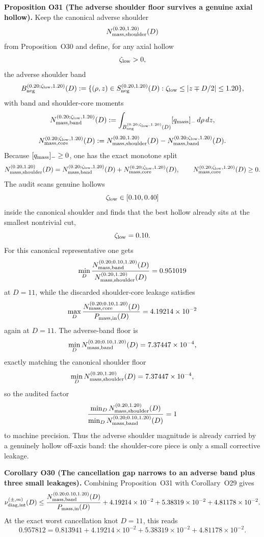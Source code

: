 \documentclass[aps,prd,onecolumn,notitlepage,nofootinbib,superscriptaddress,11pt,floatfix]{revtex4-2}
\begin{document}
\medskip\noindent\textbf{Proposition O31 (The adverse shoulder floor survives a genuine axial hollow).}
Keep the canonical adverse shoulder
\[
N_{\rm mass,shoulder}^{(0.20,1.20)}(D)
\]
from Proposition~O30 and define, for any axial hollow
\[
\zeta_{\rm low}>0,
\]
the adverse shoulder band
\[
B_{\rm neg}^{(0.20;\zeta_{\rm low},1.20)}(D)
:=
\{(\rho,z)\in S_{\rm neg}^{(0.20,1.20)}(D): \zeta_{\rm low}\le |z\mp D/2|\le 1.20\},
\]
with band and shoulder-core moments
\[
N_{\rm mass,band}^{(0.20;\zeta_{\rm low},1.20)}(D)
:=
\int_{B_{\rm neg}^{(0.20;\zeta_{\rm low},1.20)}(D)} [q_{\rm mass}]_-\,d\rho\,dz,
\]
\[
N_{\rm mass,core}^{(0.20;\zeta_{\rm low},1.20)}(D)
:=
N_{\rm mass,shoulder}^{(0.20,1.20)}(D)
-
N_{\rm mass,band}^{(0.20;\zeta_{\rm low},1.20)}(D).
\]
Because \([q_{\rm mass}]_-\ge 0\), one has the exact monotone split
\[
N_{\rm mass,shoulder}^{(0.20,1.20)}(D)
=
N_{\rm mass,band}^{(0.20;\zeta_{\rm low},1.20)}(D)
+
N_{\rm mass,core}^{(0.20;\zeta_{\rm low},1.20)}(D),
\qquad
N_{\rm mass,core}^{(0.20;\zeta_{\rm low},1.20)}(D)\ge 0.
\]
The audit
scans genuine hollows
\[
\zeta_{\rm low}\in[0.10,0.40]
\]
inside the canonical shoulder and finds that the best hollow already sits at the smallest nontrivial cut,
\[
\zeta_{\rm low}=0.10.
\]
For this canonical representative one gets
\[
\min_D
\frac{N_{\rm mass,band}^{(0.20;0.10,1.20)}(D)}
{N_{\rm mass,shoulder}^{(0.20,1.20)}(D)}
=
0.951019
\]
at \(D=11\), while the discarded shoulder-core leakage satisfies
\[
\max_D
\frac{N_{\rm mass,core}^{(0.20;0.10,1.20)}(D)}
{P_{\rm mass,in}(D)}
=
4.19214\times10^{-2}
\]
again at \(D=11\). The adverse-band floor is
\[
\min_D N_{\rm mass,band}^{(0.20;0.10,1.20)}(D)
=
7.37447\times10^{-4},
\]
exactly matching the canonical shoulder floor
\[
\min_D N_{\rm mass,shoulder}^{(0.20,1.20)}(D)
=
7.37447\times10^{-4},
\]
so the audited factor
\[
\frac{\min_D N_{\rm mass,shoulder}^{(0.20,1.20)}(D)}
{\min_D N_{\rm mass,band}^{(0.20;0.10,1.20)}(D)}
=
1
\]
to machine precision. Thus the adverse shoulder magnitude is already carried by a genuinely hollow off-axis band: the shoulder-core piece is only a small corrective leakage.

\medskip\noindent\textbf{Corollary O30 (The cancellation gap narrows to an adverse band plus three small leakages).}
Combining Proposition~O31 with Corollary~O29 gives
\[
\nu_{\rm diag,int}^{(\pm,m)}(D)
\le
\frac{N_{\rm mass,band}^{(0.20;0.10,1.20)}(D)}
{P_{\rm mass,in}(D)}
+
4.19214\times10^{-2}
+
5.38319\times10^{-2}
+
4.81178\times10^{-2}.
\]
At the exact worst cancellation knot \(D=11\), this reads
\[
0.957812
=
0.813941
+
4.19214\times10^{-2}
+
5.38319\times10^{-2}
+
4.81178\times10^{-2}.
\]
\end{document}
